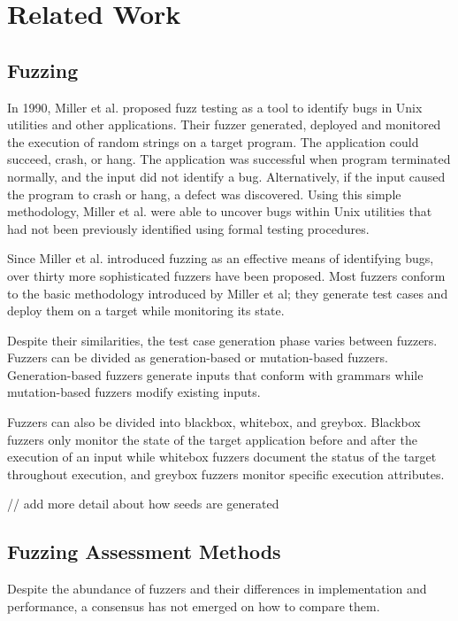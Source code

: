 \section{Related Work}

\subsection{Fuzzing}
In 1990, Miller et al. proposed fuzz testing as a tool to identify bugs in Unix utilities and other 
applications. Their fuzzer generated, deployed and monitored the execution of random strings on a 
target program. The application could succeed, crash, or hang. The application was successful when 
program terminated normally, and the input did not identify a bug. Alternatively, if the input caused 
the program to crash or hang, a defect was discovered. Using this simple methodology, Miller et al. 
were able to uncover bugs within Unix utilities that had not been previously identified using formal 
testing procedures. \cite{Miller}

Since Miller et al. introduced fuzzing as an effective means of identifying bugs, over thirty more 
sophisticated fuzzers have been proposed. Most fuzzers conform to the basic methodology introduced by 
Miller et al; they generate test cases and deploy them on a target while monitoring its state. 

Despite their similarities, the test case generation phase varies between fuzzers. Fuzzers can be 
divided as generation-based or mutation-based fuzzers. Generation-based fuzzers generate inputs that 
conform with grammars while mutation-based fuzzers modify existing inputs. 

Fuzzers can also be divided into blackbox, whitebox, and greybox. Blackbox fuzzers only monitor the 
state of the target application before and after the execution of an input while whitebox fuzzers 
document the status of the target throughout execution, and greybox fuzzers monitor specific 
execution attributes. \cite{Zhu}

// add more detail about how seeds are generated

\subsection{Fuzzing Assessment Methods}
Despite the abundance of fuzzers and their differences in implementation and performance, a consensus
 has not emerged on how to compare them.


